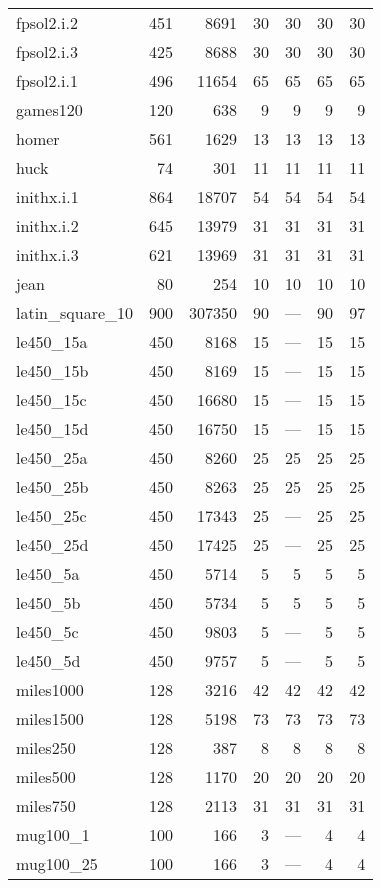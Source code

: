 \begin{longtable}{lrrrrrr}
  fpsol2.i.2 & 451 & 8691 & 30 & 30 & 30 & 30 \\ 
  fpsol2.i.3 & 425 & 8688 & 30 & 30 & 30 & 30 \\ 
  fpsol2.i.1 & 496 & 11654 & 65 & 65 & 65 & 65 \\ 
  games120 & 120 & 638 & 9 & 9 & 9 & 9 \\ 
  homer & 561 & 1629 & 13 & 13 & 13 & 13 \\ 
  huck & 74 & 301 & 11 & 11 & 11 & 11 \\ 
  inithx.i.1 & 864 & 18707 & 54 & 54 & 54 & 54 \\ 
  inithx.i.2 & 645 & 13979 & 31 & 31 & 31 & 31 \\ 
  inithx.i.3 & 621 & 13969 & 31 & 31 & 31 & 31 \\ 
  jean & 80 & 254 & 10 & 10 & 10 & 10 \\ 
  latin\_square\_10 & 900 & 307350 & 90 & --- & 90 & 97 \\ 
  le450\_15a & 450 & 8168 & 15 & --- & 15 & 15 \\ 
  le450\_15b & 450 & 8169 & 15 & --- & 15 & 15 \\ 
  le450\_15c & 450 & 16680 & 15 & --- & 15 & 15 \\ 
  le450\_15d & 450 & 16750 & 15 & --- & 15 & 15 \\ 
  le450\_25a & 450 & 8260 & 25 & 25 & 25 & 25 \\ 
  le450\_25b & 450 & 8263 & 25 & 25 & 25 & 25 \\ 
  le450\_25c & 450 & 17343 & 25 & --- & 25 & 25 \\ 
  le450\_25d & 450 & 17425 & 25 & --- & 25 & 25 \\ 
  le450\_5a & 450 & 5714 & 5 & 5 & 5 & 5 \\ 
  le450\_5b & 450 & 5734 & 5 & 5 & 5 & 5 \\ 
  le450\_5c & 450 & 9803 & 5 & --- & 5 & 5 \\ 
  le450\_5d & 450 & 9757 & 5 & --- & 5 & 5 \\ 
  miles1000 & 128 & 3216 & 42 & 42 & 42 & 42 \\ 
  miles1500 & 128 & 5198 & 73 & 73 & 73 & 73 \\ 
  miles250 & 128 & 387 & 8 & 8 & 8 & 8 \\ 
  miles500 & 128 & 1170 & 20 & 20 & 20 & 20 \\ 
  miles750 & 128 & 2113 & 31 & 31 & 31 & 31 \\ 
  mug100\_1 & 100 & 166 & 3 & --- & 4 & 4 \\ 
  mug100\_25 & 100 & 166 & 3 & --- & 4 & 4 \\ 

\end{longtable}
